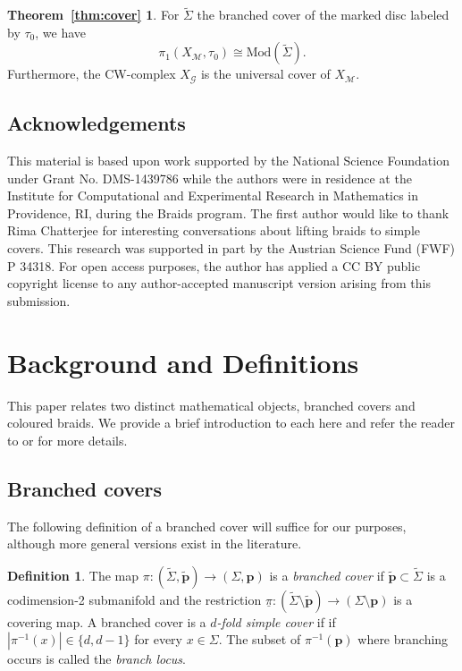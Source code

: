 \documentclass{amsart}
\theoremstyle{definition}
\newtheorem{definition}[theorem]{Definition}
\def\ws{\widetilde{\Sigma}}
\def\wpts{\widetilde{\mathbf{p}}}
\newtheorem*{coverthm}{Theorem~\ref{thm:cover}}
\begin{document}
\begin{coverthm} For $\ws$ the branched cover of the marked disc labeled by $\tau_0$, we have \[ \pi_1(X_\mathcal{M}, \tau_0)\cong\text{Mod}(\ws).\]  Furthermore, the CW-complex $X_\mathcal{G}$ is the universal cover of $X_\mathcal{M}$.  
\end{coverthm}   

\subsection{Acknowledgements}
This material is based upon work supported by the National Science Foundation under Grant No. DMS-1439786 while the authors were in residence at the Institute for Computational and Experimental Research in Mathematics in Providence, RI, during the Braids program. The first author would like to thank Rima Chatterjee for interesting conversations about lifting braids to simple covers. This research was supported in part by the Austrian Science Fund (FWF) P 34318. For open access purposes, the author has applied a CC BY public copyright license to any author-accepted manuscript version arising from this submission. 



\section{Background and Definitions}\label{sec:background}

This paper relates two distinct mathematical objects, branched covers and coloured braids.  We provide a brief introduction to each here and refer the reader to \cite{MP} or \cite{Apol} for more details.    

\subsection{Branched covers}\label{sec:brcov}

The following definition of a branched cover will suffice for our purposes, although more general versions exist in the literature. 

 \begin{definition}\label{def:simple}
The map $\pi:(\widetilde{\Sigma}, \wpts) \rightarrow (\Sigma, \mathbf{p})$ is a \textit{branched cover} if $\wpts\subset \widetilde{\Sigma}$ is a codimension-2 submanifold  and the restriction $\underline{\pi}:(\ws\setminus \wpts )\rightarrow (\Sigma\setminus \textbf{p})$ is a covering map.   A branched cover is a \textit{$d$-fold simple cover} if if $|\pi^{-1}(x)|\in \{d, d-1\}$ for every $x\in \Sigma$.  The subset of $\pi^{-1}(\mathbf{p})$ where branching occurs is called the \textit{branch locus}. 
\end{definition}
\end{document}
